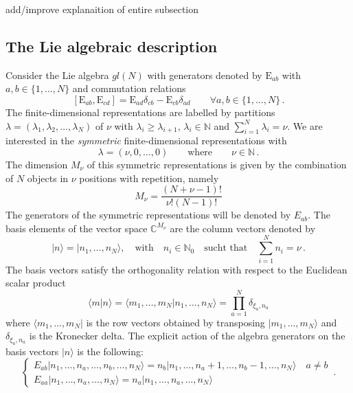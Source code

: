 \documentclass[10pt]{article}
\numberwithin{equation}{section}
\numberwithin{equation}{subsection}
\newcommand{\EE}{\mathrm{E}}
\newcommand{\twoj}{\nu}
\begin{document}
{\color{red}add/improve explanaition of entire subsection}
\subsection{The Lie algebraic description}


Consider the Lie algebra $gl(N)$ with generators denoted by $\EE_{ab}$ with $a,b\in \{1,\ldots,N\}$ and commutation relations
\begin{equation}\label{eq:comgl}
\left[\EE_{ab},\EE_{cd}\right]=\EE_{ad}\delta_{cb}-\EE_{cb}\delta_{ad}\qquad \forall a,b\in \{1,\ldots,N\}\,.
\end{equation}
The finite-dimensional representations are labelled by partitions $\lambda=(\lambda_1,\lambda_2,\ldots,\lambda_N)$ of $\nu$ with  $\lambda_i\geq \lambda_{i+1}$,  $\lambda_i\in \mathbb{N}$ and $\sum_{i=1}^N \lambda_i = \nu$.  
We are interested in the {\em symmetric} finite-dimensional representations with 
\begin{equation}\label{eq:dynkin}
    \lambda=(\twoj,0,\ldots,0) \qquad\text{where}\qquad \twoj\in\mathbb{N}\,.
\end{equation} 
The dimension $M_\twoj$ of this symmetric representations is given by the combination of $N$ objects in $\twoj$ positions with repetition, namely
\begin{equation}
	M_\twoj= \frac{(N+\twoj-1)!}{\twoj  !(N-1)!}
\end{equation} 
The generators of the symmetric representations will be denoted by $E_{ab}$.
The basis elements of the vector space $\mathbb{C}^{M_\twoj}$ are the column vectors denoted by
\begin{equation}
  |n\rangle=  |n_{1},\ldots,n_{N}\rangle,\quad \text{with}\quad n_{i}\in\mathbb{N}_{0}\quad \text{sucht that}\quad \sum_{i=1}^{N}n_{i}=\nu\,.
\end{equation}
The basis vectors satisfy the orthogonality relation with respect to the Euclidean scalar product 
\begin{equation}\label{ortho}
   \langle m|n \rangle =\langle m_{1},\ldots,m_{N}|n_{1},\ldots,n_{N}\rangle=\prod_{a=1}^{N}\delta_{\xi_{a},n_{a}}
\end{equation}
where  $ \langle m_{1},\ldots,m_{N}|$ is the row vectors obtained by transposing $|m_{1},\ldots,m_{N}\rangle$ and $\delta_{\xi_{a},n_{a}}$ is the Kronecker delta. 
The explicit action of the algebra generators on the basis  vectors $|n\rangle$ is the following:
\begin{equation}\label{actionE}
	\begin{cases}
		E_{ab}|n_{1},\ldots,n_{a},\ldots,n_{b},\ldots,n_{N}\rangle =n_{b}|n_{1},\ldots,n_{a}+1,\ldots,n_{b}-1,\ldots,n_{N}\rangle\quad a\neq b\\[0.1cm]
		E_{aa}|n_{1},\ldots,n_{a},\ldots,n_{N}\rangle = n_{a} |n_{1},\ldots,n_{a},\ldots,n_{N}\rangle
	\end{cases}\,.
\end{equation}  
\end{document}
